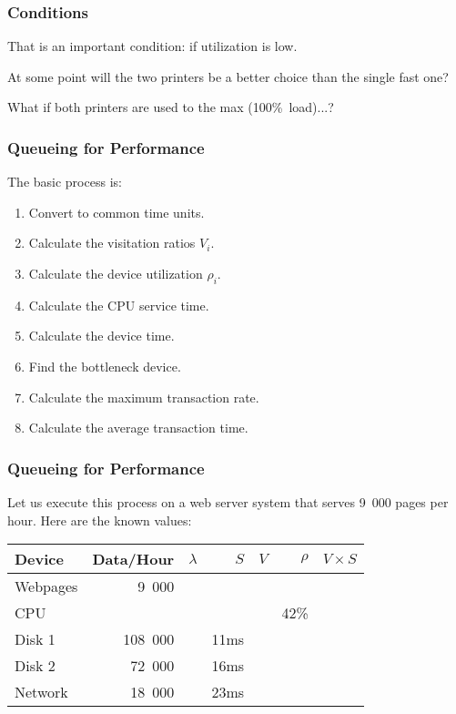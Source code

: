 \begin{frame}
\frametitle{Conditions}

\large
\begin{changemargin}{1.5cm}
That is an important condition: if utilization is low. 

At some point will the two printers be a better choice than the single fast one? 

What if both printers are used to the max (100\%~load)...?
\end{changemargin}

\end{frame}



\begin{frame}
\frametitle{Queueing for Performance}

\large
\begin{changemargin}{1.5cm}
The basic process is:

\begin{enumerate}
	\item Convert to common time units.
	\item Calculate the visitation ratios $V_{i}$.
	\item Calculate the device utilization $\rho_{i}$.
	\item Calculate the CPU service time.
	\item Calculate the device time.
	\item Find the bottleneck device.
	\item Calculate the maximum transaction rate.
	\item Calculate the average transaction time.
\end{enumerate}
\end{changemargin}
\end{frame}



\begin{frame}
\frametitle{Queueing for Performance}

\begin{changemargin}{1cm}
\large Let us execute this process on a web server system that serves 9~000 pages per hour. Here are the known values:
\end{changemargin}

\begin{center}
\begin{tabular}{l|r|r|r|r|r|r} 
	\textbf{Device} & \textbf{Data/Hour} & \textbf{$\lambda$} & \textbf{$S$} & \textbf{$V$} & \textbf{$\rho$} & \textbf{$V \times S$} \\ \hline
	Webpages & 9~000 & & & & & \\ \hline
	CPU & & & & &  42\% & \\ \hline
	Disk 1 & 108~000 & & 11ms & & &\\ \hline
	Disk 2 & 72~000 & & 16ms & & &\\ \hline
	Network & 18~000 & & 23ms & & &\\ 
\end{tabular}
\end{center}

\end{frame}



